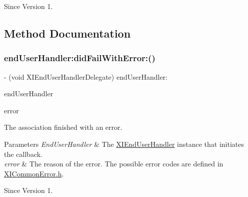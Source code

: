 \begin{DoxySince}{Since}
Version 1. 
\end{DoxySince}


\subsection{Method Documentation}
\hypertarget{protocol_x_i_end_user_handler_delegate_01-p_aeb6d8cfc627717ab2d408c5f7fb84450}{}\label{protocol_x_i_end_user_handler_delegate_01-p_aeb6d8cfc627717ab2d408c5f7fb84450} 
\subsubsection{\texorpdfstring{end\+User\+Handler\+:did\+Fail\+With\+Error\+:()}{endUserHandler:didFailWithError:()}}
{\footnotesize\ttfamily -\/ (void X\+I\+End\+User\+Handler\+Delegate) end\+User\+Handler\+: \begin{DoxyParamCaption}\item[{(id$<$ X\+I\+End\+User\+Handler $>$)}]{end\+User\+Handler }\item[{didFailWithError:(N\+S\+Error $\ast$)}]{error }\end{DoxyParamCaption}}



The association finished with an error. 


\begin{DoxyParams}{Parameters}
{\em End\+User\+Handler} & The \hyperlink{class_x_i_end_user_handler-p}{X\+I\+End\+User\+Handler} instance that initiates the callback. \\
\hline
{\em error} & The reason of the error. The possible error codes are defined in \hyperlink{_x_i_common_error_8h}{X\+I\+Common\+Error.\+h}. \\
\hline
\end{DoxyParams}
\begin{DoxySince}{Since}
Version 1. 
\end{DoxySince}
\hypertarget{protocol_x_i_end_user_handler_delegate_01-p_a0c55fb34803563aa252942903d6216b6}{}\label{protocol_x_i_end_user_handler_delegate_01-p_a0c55fb34803563aa252942903d6216b6} 
